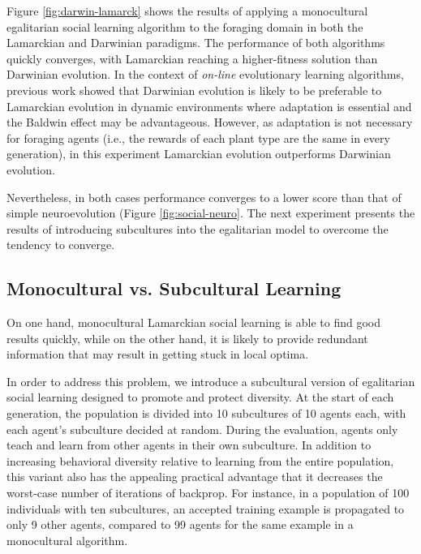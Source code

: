\documentclass{sig-alternate}
\begin{document}
Figure \ref{fig:darwin-lamarck} shows the results of applying a monocultural egalitarian social learning algorithm to the foraging domain in both the Lamarckian and Darwinian paradigms. The performance of both algorithms quickly converges, with Lamarckian reaching a higher-fitness solution than Darwinian evolution. In the context of \textit{on-line} evolutionary learning algorithms, previous work \cite{whiteson2006evolutionary} showed that Darwinian evolution is likely to be preferable to Lamarckian evolution in dynamic environments where adaptation is essential and the Baldwin effect \cite{simpson1953baldwin} may be advantageous. However, as adaptation is not necessary for foraging agents (i.e., the rewards of each plant type are the same in every generation), in this experiment Lamarckian evolution outperforms Darwinian evolution.

Nevertheless, in both cases performance converges to a lower score than that of simple neuroevolution (Figure \ref{fig:social-neuro}. The next experiment presents the results of introducing subcultures into the egalitarian model to overcome the tendency to converge.

\subsection*{Monocultural vs. Subcultural Learning}
On one hand, monocultural Lamarckian social learning is able to find good results quickly, while on the other hand, it is likely to provide redundant information that may result in getting stuck in local optima.  

In order to address this problem, we introduce a subcultural version of egalitarian social learning designed to promote and protect diversity. At the start of each generation, the population is divided into 10 subcultures of 10 agents each, with each agent's subculture decided at random. During the evaluation, agents only teach and learn from other agents in their own subculture. In addition to increasing behavioral diversity relative to learning from the entire population, this variant also has the appealing practical advantage that it decreases the worst-case number of iterations of backprop. For instance, in a population of 100 individuals with ten subcultures, an accepted training example is propagated to only 9 other agents, compared to 99 agents for the same example in a monocultural algorithm.
\end{document}
